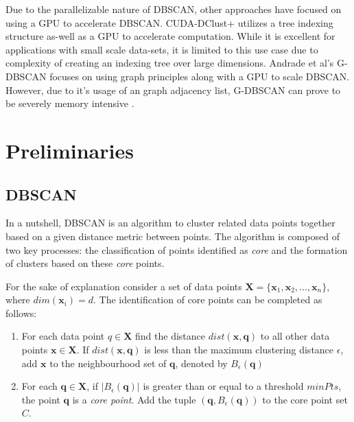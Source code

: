 \documentclass{article}
\newcommand{\bX}{\mathbf{X}}
\newcommand{\bq}{\mathbf{q}}
\newcommand{\bx}{\mathbf{x}}
\newcommand{\eps}{\epsilon}
\newcommand{\Bq}{B_{\eps}(\bq)}
\begin{document}
Due to the parallelizable nature of DBSCAN, other approaches \cite{andrade_g-dbscan_2013, poudel_cuda-dclust_2021, thapa_memory-efficient_2010} have focused on using a GPU to accelerate DBSCAN. CUDA-DClust+ \cite{poudel_cuda-dclust_2021} utilizes a tree indexing structure as-well as a GPU to accelerate computation. While it is excellent for applications with small scale data-sets, it is limited to this use case due to complexity of creating an indexing tree over large dimensions. Andrade et al's G-DBSCAN \cite{andrade_g-dbscan_2013} focuses on using graph principles along with a GPU to scale DBSCAN. However, due to it's usage of an graph adjacency list, G-DBSCAN can prove to be severely memory intensive \cite{mustafa_experimental_2019}. 


\section{Preliminaries}

\subsection{DBSCAN}
In a nutshell, DBSCAN \cite{DBSCAN} is an algorithm to cluster related data points together based on a given distance metric between points. The algorithm is composed of two key processes: the classification of points identified as \textit{core} and the formation of clusters based on these \textit{core} points.

For the sake of explanation consider a set of data points $\bX = \{\bx_1, \bx_2, \dots, \bx_n\}$, where $\textit{dim}(\bx_i) = d$. The identification of core points can be completed as follows:

\begin{enumerate}
	\item For each data point $q \in \bX$ find the distance  $\textit{dist}(\bx, \bq)$  to all other data points $\bx \in \bX$. If $\textit{dist}(\bx, \bq)$ is less than the maximum clustering distance $\eps$, add $\bx$ to the neighbourhood set of $\bq$, denoted by $\Bq$ 
	\item For each $\bq \in \bX$, if $|\Bq|$ is greater than or equal to a threshold $minPts$, the point $\bq$ is a \textit{core point}. Add the tuple $(\bq, \Bq)$ to the core point set $C$. 
\end{enumerate}
\end{document}
